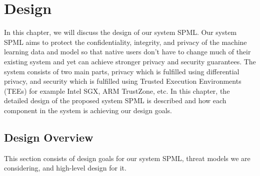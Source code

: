 \chapter{Design}
\label{sec:design}
In this chapter, we will discuss the design of our system SPML. Our system SPML aims to protect the confidentiality, integrity, and privacy of the machine learning data and model so that native users don't have to change much of their existing system and yet can achieve stronger privacy and security guarantees. The system consists of two main parts, privacy which is fulfilled using differential privacy, and security which is fulfilled using Trusted Execution Environments (TEEs) for example Intel SGX, ARM TrustZone, etc. In this chapter, the detailed design of the proposed system SPML is described and how each component in the system is achieving our design goals. 
\section{Design Overview}
This section consists of design goals for our system SPML, threat models we are considering, and high-level design for it.
